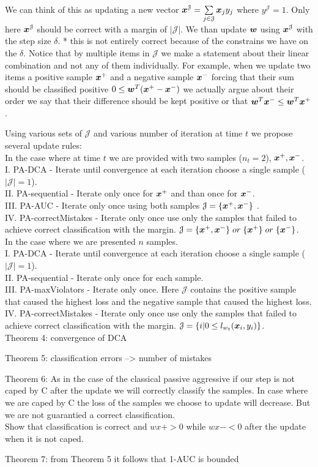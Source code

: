 We can think of this as updating a new vector $\bm{x}^\mathcal{J} = \sum\limits_{j \in \mathcal{J} }{\bm{x}_j y_j}$ where $y^\mathcal{J} = 1 $. Only here $\bm{x}^\mathcal{J}$ should be correct with a margin of $|\mathcal{J}| $.  We than update $\bm{w}$ using $\bm{x}^\mathcal{J}$ with the step size $\delta$. 
* this is not entirely correct because of the constrains we have on the $\delta$.
Notice that by multiple items in $\mathcal{J}$ we make a statement about their linear combination and not any of them individually. For example, when we update two items a positive sample $\bm{x}^+$ and a negative sample $\bm{x}^-$ forcing that their sum should be classified positive $0 \leq \bm{w}^T (\bm{x}^+ - \bm{x}^-) $ we actually argue about their order we say that their difference should be kept positive or that $ \bm{w}^T \bm{x}^- \leq \bm{w}^T \bm{x}^+$.


Using various sets of $ \mathcal{J} $ and various number of iteration at time $t$ we propose several update rules:\\

In the case where at time $t$ we are provided with two samples ($n_t=2$), $\bm{x}^+, \bm{x}^-$.\\
I. PA-DCA - Iterate until convergence at each iteration choose a single sample ($|\mathcal{J}|=1$).\\
II. PA-sequential - Iterate only once for $\bm{x}^+$ and than once for $\bm{x}^-$.\\
III. PA-AUC - Iterate only once using both samples $\mathcal{J} = \{\bm{x}^+, \bm{x}^-\} $ .\\
IV. PA-correctMistakes - Iterate only once use only the samples that failed to achieve correct classification with the margin. $\mathcal{J} = \{\bm{x}^+, \bm{x}^-\} \; or \;\{\bm{x}^+ \} \; or \; \{ \bm{x}^- \}$.\\

In the case where we are presented $n$ samples. \\
I. PA-DCA - Iterate until convergence at each iteration choose a single sample ($|\mathcal{J}|=1$).\\
II. PA-sequential - Iterate only once for each sample.\\
III. PA-maxViolators - Iterate only once. Here $\mathcal{J}$ contains the positive sample that caused the highest loss and the negative sample that caused the highest loss. \\
IV. PA-correctMistakes - Iterate only once use only the samples that failed to achieve correct classification with the margin. $\mathcal{J} = \{ i | 0 \leq l_{w_t}(\bm{x}_i, y_i) \}$.\\


Theorem 4: convergence of DCA

Theorem 5: classification errors --> number of mistakes

Theorem 6: As in the case of the classical passive aggressive if our step is not caped by C after the update we will correctly classify the samples. In case where we are caped by C the loss of the samples we choose to update will decrease. But we are not guarantied a correct classification. \\
Show that classification is correct and $ w x+ >0$ while $w x- < 0$ after the update when it is not caped.

Theorem 7: from Theorem 5 it follows that 1-AUC is bounded
